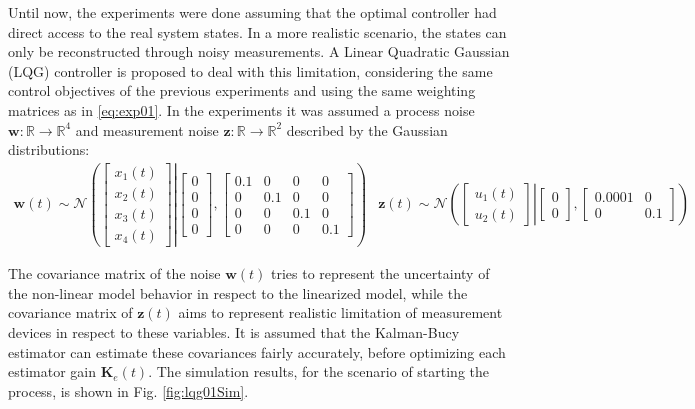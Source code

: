 \documentclass[a4paper,11pt]{book}
\numberwithin{figure}{chapter}
\numberwithin{equation}{chapter}
\numberwithin{table}{chapter}
\theoremstyle{definition}
\begin{document}
Until now, the experiments were done assuming that the optimal controller had direct access to the real system states. In a more realistic scenario, the states can only be reconstructed through noisy measurements. A Linear Quadratic Gaussian (LQG) controller is proposed to deal with this limitation, considering the same control objectives of the previous experiments and using the same weighting matrices as in \eqref{eq:exp01}. In the experiments it was assumed a process noise $\bm{w} : \mathbb{R} \rightarrow \mathbb{R}^{4}$ and measurement noise $\bm{z} : \mathbb{R} \rightarrow \mathbb{R}^{2}$ described by the Gaussian distributions:
\begin{equation}
\begin{matrix}
	\bm{w}(t) \sim \mathcal{N}\left( \left. \begin{bmatrix} x_1(t) \\ x_2(t) \\ x_3(t) \\ x_4(t) \end{bmatrix} \right| \begin{bmatrix} 0 \\ 0 \\ 0 \\ 0 \end{bmatrix}, \begin{bmatrix} 0.1 & 0 & 0 & 0 \\ 0 & 0.1 & 0 & 0 \\ 0 & 0 & 0.1 & 0 \\ 0 & 0 & 0 & 0.1 \end{bmatrix} \right) & 
\bm{z}(t) \sim \mathcal{N}\left( \left. \begin{bmatrix} u_1(t) \\ u_2(t) \end{bmatrix} \right| \begin{bmatrix} 0 \\ 0 \end{bmatrix}, \begin{bmatrix} 0.0001 & 0 \\ 0 & 0.1 \end{bmatrix} \right)
\end{matrix}
\end{equation}

The covariance matrix of the noise $\bm{w}(t)$ tries to represent the uncertainty of the non-linear model behavior in respect to the linearized model, while the covariance matrix of $\bm{z}(t)$ aims to represent realistic limitation of measurement devices in respect to these variables. It is assumed that the Kalman-Bucy estimator can estimate these covariances fairly accurately, before optimizing each estimator gain $\bm{K}_e(t)$. The simulation results, for the scenario of starting the process, is shown in Fig. \ref{fig:lqg01Sim}.
 
\end{document}
